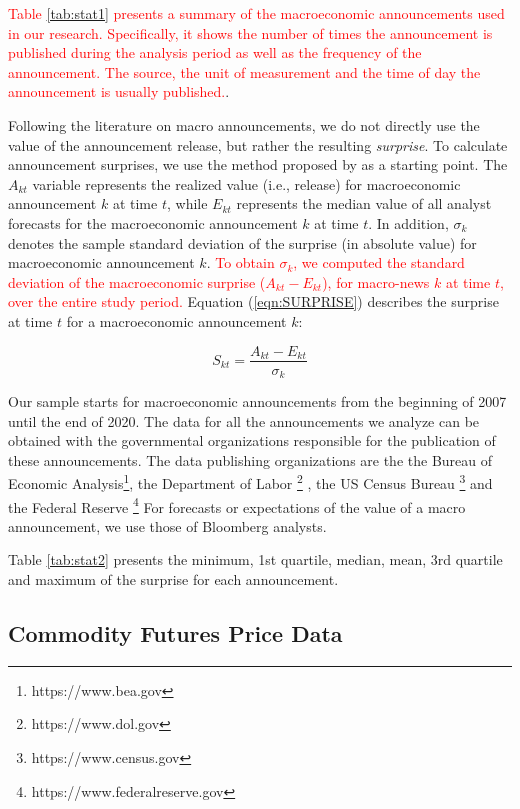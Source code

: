 \documentclass[12pt]{article}
\begin{document}
\textcolor{red}{Table \ref{tab:stat1} presents a summary of the macroeconomic announcements used in our research. Specifically, it shows the number of times the announcement is published during the analysis period as well as the frequency of the announcement.  The source, the unit of measurement and the time of day the announcement is usually published.}\citep[see e.g.,][]{kurov2019price}. 

Following the literature on macro announcements, we do not directly use the value of the announcement release, but rather the resulting \emph{surprise}. To calculate announcement surprises, we use the method proposed by \citet{balduzzi2001economic} as a starting point. The  $A_{kt}$ variable represents the realized value (i.e., release) for macroeconomic announcement $k$ at time $t$, while $E_{kt}$ represents the median value of all analyst forecasts for the macroeconomic announcement $k$ at time $t$. In addition, $\sigma_k$ denotes the sample standard deviation of the surprise (in absolute value) for macroeconomic announcement $k$. \textcolor{red}{To obtain $\sigma_k$, we computed the standard deviation of the macroeconomic surprise ($A_{kt}-E_{kt}$), for macro-news $k$ at time $t$, over the entire study period.} Equation (\ref{eqn:SURPRISE}) describes the surprise at time $t$ for a macroeconomic announcement $k$:

\begin{equation}\label{eqn:SURPRISE}
S_{kt}=\frac{A_{kt}-E_{kt}}{\sigma_k}
\end{equation}

Our sample starts for macroeconomic announcements from the beginning of 2007 until the end of 2020. The data for all the announcements we analyze can be obtained with the governmental organizations responsible for the publication of these announcements. The data publishing organizations are the the Bureau of Economic Analysis\footnote{https://www.bea.gov}, the Department of Labor \footnote{https://www.dol.gov} , the US Census Bureau \footnote{https://www.census.gov}  and the  Federal Reserve \footnote{https://www.federalreserve.gov}
For forecasts or expectations of the value of a macro announcement, we use those of Bloomberg analysts. 

Table \ref{tab:stat2} presents the minimum, 1st quartile, median, mean, 3rd quartile and maximum of the surprise for each announcement. 
\subsection{Commodity Futures Price Data}
\end{document}

